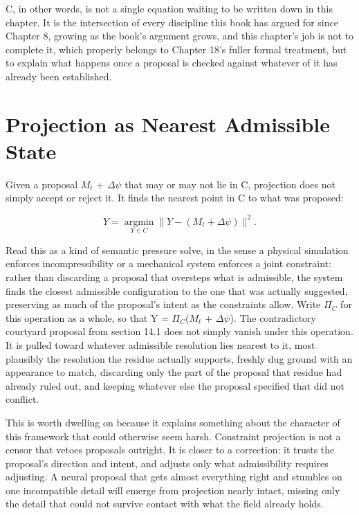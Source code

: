 C, in other words, is not a single equation waiting to be written down in this chapter. It is the intersection of every discipline this book has argued for since Chapter 8, growing as the book's argument grows, and this chapter's job is not to complete it, which properly belongs to Chapter 18's fuller formal treatment, but to explain what happens once a proposal is checked against whatever of it has already been established.

\section{Projection as Nearest Admissible State}

Given a proposal \(M_t\) + \(\Delta\psi\) that may or may not lie in C, projection does not simply accept or reject it. It finds the nearest point in C to what was proposed:

\[ Y = \operatorname*{argmin}_{Y \in C} \|Y - (M_t + \Delta\psi)\|^2. \]

Read this as a kind of semantic pressure solve, in the sense a physical simulation enforces incompressibility or a mechanical system enforces a joint constraint: rather than discarding a proposal that oversteps what is admissible, the system finds the closest admissible configuration to the one that was actually suggested, preserving as much of the proposal's intent as the constraints allow. Write \(\Pi_C\) for this operation as a whole, so that Y = \(\Pi_C\)(\(M_t\) + \(\Delta\psi\)). The contradictory courtyard proposal from section 14.1 does not simply vanish under this operation. It is pulled toward whatever admissible resolution lies nearest to it, most plausibly the resolution the residue actually supports, freshly dug ground with an appearance to match, discarding only the part of the proposal that residue had already ruled out, and keeping whatever else the proposal specified that did not conflict.

This is worth dwelling on because it explains something about the character of this framework that could otherwise seem harsh. Constraint projection is not a censor that vetoes proposals outright. It is closer to a correction: it trusts the proposal's direction and intent, and adjusts only what admissibility requires adjusting. A neural proposal that gets almost everything right and stumbles on one incompatible detail will emerge from projection nearly intact, missing only the detail that could not survive contact with what the field already holds.

